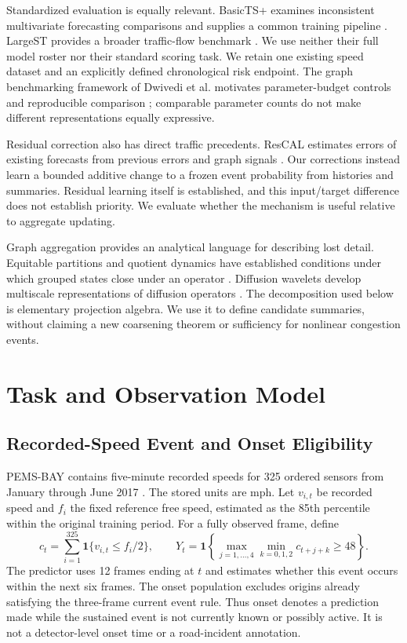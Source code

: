 \documentclass{llncs}
\begin{document}
Standardized evaluation is equally relevant. BasicTS+ examines inconsistent multivariate forecasting comparisons and supplies a common training pipeline \cite{basicts}. LargeST provides a broader traffic-flow benchmark \cite{largest}. We use neither their full model roster nor their standard scoring task. We retain one existing speed dataset and an explicitly defined chronological risk endpoint. The graph benchmarking framework of Dwivedi et al. motivates parameter-budget controls and reproducible comparison \cite{benchmark}; comparable parameter counts do not make different representations equally expressive.

Residual correction also has direct traffic precedents. ResCAL estimates errors of existing forecasts from previous errors and graph signals \cite{rescal}. Our corrections instead learn a bounded additive change to a frozen event probability from histories and summaries. Residual learning itself is established, and this input/target difference does not establish priority. We evaluate whether the mechanism is useful relative to aggregate updating.

Graph aggregation provides an analytical language for describing lost detail. Equitable partitions and quotient dynamics have established conditions under which grouped states close under an operator \cite{schaub}. Diffusion wavelets develop multiscale representations of diffusion operators \cite{diffusion}. The decomposition used below is elementary projection algebra. We use it to define candidate summaries, without claiming a new coarsening theorem or sufficiency for nonlinear congestion events.

\section{Task and Observation Model}
\subsection{Recorded-Speed Event and Onset Eligibility}
PEMS-BAY contains five-minute recorded speeds for 325 ordered sensors from January through June 2017 \cite{dcrnn,release}. The stored units are mph. Let $v_{i,t}$ be recorded speed and $f_i$ the fixed reference free speed, estimated as the 85th percentile within the original training period. For a fully observed frame, define
\begin{equation}
 c_t=\sum_{i=1}^{325}\mathbf{1}\{v_{i,t}\leq f_i/2\},\qquad
 Y_t=\mathbf{1}\!\left\{\max_{j=1,\ldots,4}\min_{k=0,1,2}c_{t+j+k}\geq48\right\}.
\label{eq:target}
\end{equation}
The predictor uses 12 frames ending at $t$ and estimates whether this event occurs within the next six frames. The onset population excludes origins already satisfying the three-frame current event rule. Thus onset denotes a prediction made while the sustained event is not currently known or possibly active. It is not a detector-level onset time or a road-incident annotation.
\end{document}
